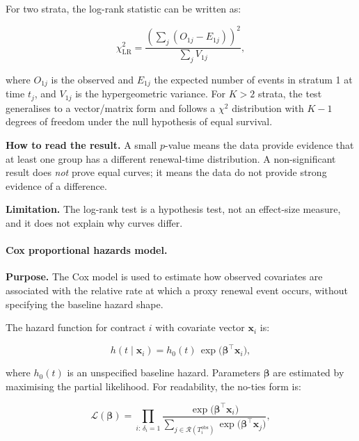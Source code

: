 \documentclass[12pt, a4paper]{article}
\begin{document}
For two strata, the log-rank statistic can be written as:

\begin{equation}
  \chi^2_{\text{LR}}
  =
  \frac{\left(\sum_j (O_{1j} - E_{1j})\right)^2}
       {\sum_j V_{1j}},
\end{equation}

where $O_{1j}$ is the observed and $E_{1j}$ the expected number of events in
stratum 1 at time $t_j$, and $V_{1j}$ is the hypergeometric variance. For
$K>2$ strata, the test generalises to a vector/matrix form and follows a
$\chi^2$ distribution with $K - 1$ degrees of freedom under the null hypothesis
of equal survival.

\textbf{How to read the result.} A small $p$-value means the data provide
evidence that at least one group has a different renewal-time distribution. A
non-significant result does \emph{not} prove equal curves; it means the data do
not provide strong evidence of a difference.

\textbf{Limitation.} The log-rank test is a hypothesis test, not an effect-size
measure, and it does not explain why curves differ.

\paragraph{Cox proportional hazards model.}
\textbf{Purpose.} The Cox model is used to estimate how observed covariates are
associated with the relative rate at which a proxy renewal event occurs,
without specifying the baseline hazard shape.

The hazard function for contract $i$ with covariate vector $\mathbf{x}_i$ is:

\begin{equation}
  h(t \mid \mathbf{x}_i)
  =
  h_0(t)\,\exp\!\bigl(\boldsymbol{\beta}^\top \mathbf{x}_i\bigr),
\end{equation}

where $h_0(t)$ is an unspecified baseline hazard. Parameters $\boldsymbol{\beta}$
are estimated by maximising the partial likelihood. For readability, the
no-ties form is:

\begin{equation}
  \mathcal{L}(\boldsymbol{\beta})
  =
  \prod_{i:\,\delta_i = 1}
  \frac{\exp\!\bigl(\boldsymbol{\beta}^\top \mathbf{x}_i\bigr)}
       {\displaystyle\sum_{j \in \mathcal{R}(T_i^{\text{obs}})}
        \exp\!\bigl(\boldsymbol{\beta}^\top \mathbf{x}_j\bigr)},
\end{equation}
\end{document}
